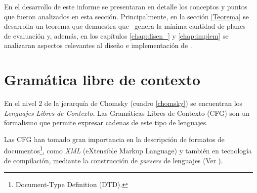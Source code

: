En el desarrollo de este informe se presentaran en detalle los conceptos y puntos que fueron analizados en esta sección. Principalmente, en la sección \ref{Teorema} se desarrolla un teorema que demuestra que \maggen\ genera la mínima cantidad de planes de evaluación y, además, en los capítulos \ref{chap:disen_} y \ref{chap:implem} se analizaran aspectos relevantes al diseño e implementación de \maggen.



\section{Gramática libre de contexto}
\label{sec:def-CFG}
En el nivel 2 de la jerarquía de Chomsky (cuadro \ref{chomsky}) se encuentran los \textit{Lenguajes Libres de Contexto}. Las Gramáticas Libres de Contexto (CFG) son un formalismo que permite expresar cadenas de este tipo de lenguajes.

Las CFG han tomado gran importancia en la descripción de formatos de documentos\footnote{Document-Type Definition (DTD).}, como \textit{XML} (eXtensible Markup Language) y también en tecnología de compilación, mediante la construcción de \textit{parsers} de lenguajes (Ver \cite{compiladores}).  

